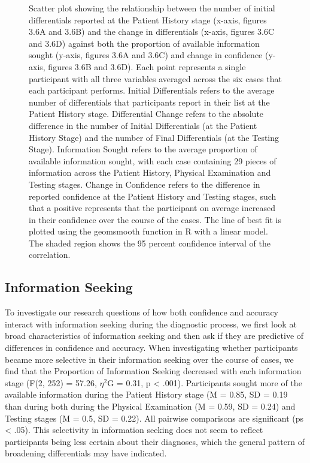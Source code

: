 \documentclass[a4paper, nobind]{templates/ociamthesis}
\begin{document}
\begin{figure}[H]
\caption{Scatter plot showing the relationship between the number of initial differentials reported at the Patient History stage (x-axis, figures 3.6A and 3.6B) and the change in differentials (x-axis, figures 3.6C and 3.6D) against both the proportion of available information sought (y-axis, figures 3.6A and 3.6C) and change in confidence (y-axis, figures 3.6B and 3.6D). Each point represents a single participant with all three variables averaged across the six cases that each participant performs. Initial Differentials refers to the average number of differentials that participants report in their list at the Patient History stage. Differential Change refers to the absolute difference in the number of Initial Differentials (at the Patient History Stage) and the number of Final Differentials (at the Testing Stage). Information Sought refers to the average proportion of available information sought, with each case containing 29 pieces of information across the Patient History, Physical Examination and Testing stages. Change in Confidence refers to the difference in reported confidence at the Patient History and Testing stages, such that a positive represents that the participant on average increased in their confidence over the course of the cases. The line of best fit is plotted using the geomsmooth function in R with a linear model. The shaded region shows the 95 percent confidence interval of the correlation.}\label{fig:diffsPlot}
\end{figure}

\newpage

\subsection{Information Seeking}\label{information-seeking}

To investigate our research questions of how both confidence and accuracy interact with information seeking during the diagnostic process, we first look at broad characteristics of information seeking and then ask if they are predictive of differences in confidence and accuracy. When investigating whether participants became more selective in their information seeking over the course of cases, we find that the Proportion of Information Seeking decreased with each information stage (F(2, 252) = 57.26, \(\eta^2\)G = 0.31, p \textless{} .001). Participants sought more of the available information during the Patient History stage (M = 0.85, SD = 0.19 than during both during the Physical Examination (M = 0.59, SD = 0.24) and Testing stages (M = 0.5, SD = 0.22). All pairwise comparisons are significant (ps \textless{} .05). This selectivity in information seeking does not seem to reflect participants being less certain about their diagnoses, which the general pattern of broadening differentials may have indicated.\\
\end{document}

